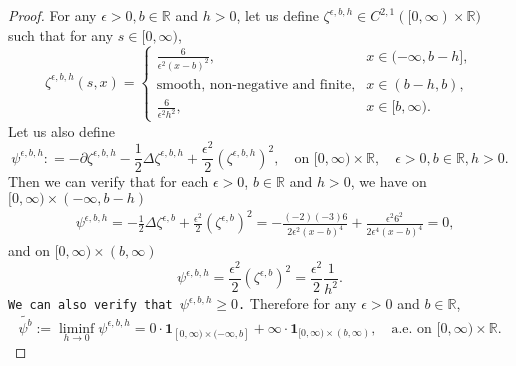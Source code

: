 \documentclass[12pt,a4paper]{amsart}
\numberwithin{equation}{section}
\theoremstyle{plain}
\theoremstyle{remark}
\begin{document}
\begin{proof}
	For any $\epsilon>0, b\in \mathbb R$ and $h >0$, let us define $\zeta^{\epsilon, b,h} \in C^{2,1}([0,\infty) \times \mathbb R)$ such that for any $s\in [0,\infty)$,
\[
	\zeta^{\epsilon, b,h}(s,x) = 
	\begin{cases}
		\frac{6}{\epsilon^2 (x-b)^2}, & x\in (-\infty, b-h],
		\\ \text{smooth, non-negative and finite,} & x\in (b-h, b),
		\\ \frac{6}{\epsilon^2 h^2}, & x\in [b, \infty).
	\end{cases}
\]
	Let us also define 
\begin{equation} \label{eq:W.045}
	\psi^{\epsilon, b, h} : = - \partial \zeta^{\epsilon, b,h} - \frac{1}{2}\Delta \zeta^{\epsilon, b,h} + \frac{\epsilon^2}{2} (\zeta^{\epsilon, b,h})^2, \quad \text{on } [0,\infty)\times \mathbb R, \quad \epsilon>0, b \in \mathbb R, h > 0.
\end{equation}
	Then we can verify that for each $\epsilon> 0$, $b \in \mathbb R$ and $h > 0$, we have on $[0, \infty)\times (-\infty,b-h)$
\begin{align}
	&\psi^{\epsilon, b, h}
	=  - \frac{1}{2} \Delta \zeta^{\epsilon, b} + \frac{\epsilon^2}{2} (\zeta^{\epsilon,b})^2 
	= - \frac{(-2)(-3) 6}{2\epsilon^2 (x-b)^4} + \frac{\epsilon^2 6^2}{2\epsilon^4 (x-b)^4} 
	=0,
\end{align}
	and on $[0,\infty) \times (b, \infty)$
\begin{equation}
	\psi^{\epsilon, b, h} = \frac{\epsilon^2}{2} (\zeta^{\epsilon,b})^2 = \frac{\epsilon^2}{2}\frac{1}{h^2}.
\end{equation}
	{\tt We can also verify that $\psi^{\epsilon, b , h} \geq 0$.}
	Therefore for any $\epsilon > 0$ and $b \in \mathbb R$,
\begin{equation}
	\widetilde {\psi^b}:=\liminf_{h\to 0} \psi^{\epsilon, b, h} = 0 \cdot \mathbf 1_{[0,\infty) \times (-\infty, b]} + \infty \cdot \mathbf 1_{[0,\infty)\times (b, \infty)}, \quad \text{a.e. on $[0,\infty) \times \mathbb R$}.
\end{equation}


\end{proof}
\end{document}

